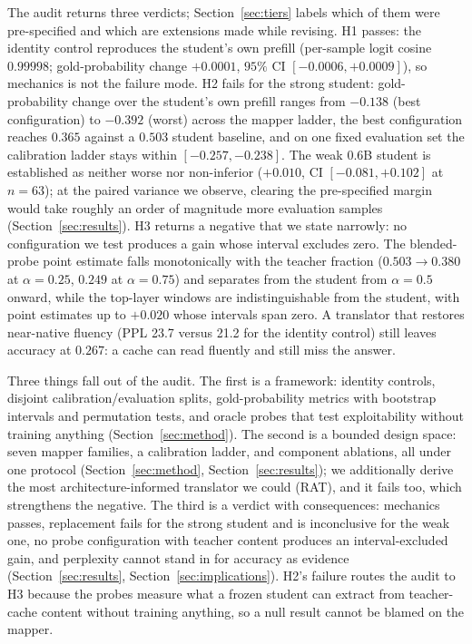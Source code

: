 \documentclass{article} %
\begin{document}
The audit returns three verdicts; Section~\ref{sec:tiers} labels which of them
were pre-specified and which are extensions made while revising. H1 passes: the
identity control reproduces the student's own prefill (per-sample logit cosine
$0.99998$; gold-probability change $+0.0001$, $95\%$ CI $[-0.0006, +0.0009]$),
so mechanics is not the failure mode. H2 fails for the strong student:
gold-probability change over the student's own prefill ranges from $-0.138$
(best configuration) to $-0.392$ (worst) across the mapper ladder, the best
configuration reaches $0.365$ against a $0.503$ student baseline, and on one
fixed evaluation set the calibration ladder stays within $[-0.257, -0.238]$.
The weak 0.6B student is established as neither worse nor non-inferior
($+0.010$, CI $[-0.081, +0.102]$ at $n{=}63$); at the paired variance we
observe, clearing the pre-specified margin would take roughly an order of
magnitude more evaluation samples (Section~\ref{sec:results}). H3 returns a
negative that we state narrowly: no configuration we test produces a gain whose
interval excludes zero. The blended-probe point estimate falls monotonically
with the teacher fraction ($0.503 \to 0.380$ at $\alpha{=}0.25$, $0.249$ at
$\alpha{=}0.75$) and separates from the student from $\alpha{=}0.5$ onward,
while the top-layer windows are indistinguishable from the student, with point
estimates up to $+0.020$ whose intervals span zero. A translator that restores
near-native fluency (PPL 23.7 versus 21.2 for the identity control) still leaves
accuracy at $0.267$: a cache can read fluently and still miss the answer.

Three things fall out of the audit. The first is a framework: identity
controls, disjoint calibration/evaluation splits, gold-probability metrics
with bootstrap intervals and permutation tests, and oracle probes that test
exploitability without training anything (Section~\ref{sec:method}). The
second is a bounded design space: seven mapper families, a calibration ladder,
and component ablations, all under one protocol
(Section~\ref{sec:method}, Section~\ref{sec:results}); we additionally derive
the most architecture-informed translator we could (RAT), and it fails too,
which strengthens the negative. The third is a verdict
with consequences: mechanics passes, replacement fails for the strong student
and is inconclusive for the weak one, no probe configuration with teacher
content produces an interval-excluded gain, and perplexity
cannot stand in for accuracy as evidence (Section~\ref{sec:results},
Section~\ref{sec:implications}). H2's failure routes the audit to H3
because the probes measure what a frozen student can extract from
teacher-cache content without training anything, so a null result cannot
be blamed on the mapper.
\end{document}

